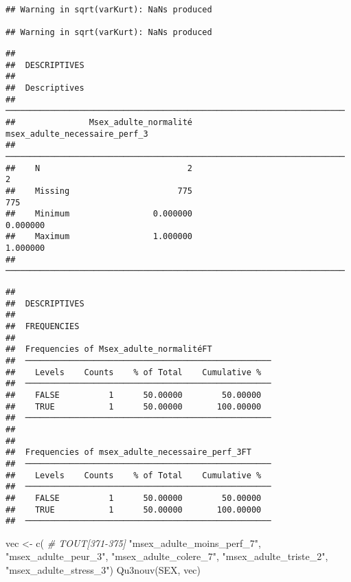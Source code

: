 \documentclass[
]{article}
\newenvironment{Shaded}{\begin{snugshade}}{\end{snugshade}}
\newcommand{\CommentTok}[1]{\textcolor[rgb]{0.56,0.35,0.01}{\textit{#1}}}
\newcommand{\FunctionTok}[1]{\textcolor[rgb]{0.00,0.00,0.00}{#1}}
\newcommand{\NormalTok}[1]{#1}
\newcommand{\OtherTok}[1]{\textcolor[rgb]{0.56,0.35,0.01}{#1}}
\newcommand{\StringTok}[1]{\textcolor[rgb]{0.31,0.60,0.02}{#1}}
\begin{document}
\begin{verbatim}
## Warning in sqrt(varKurt): NaNs produced

## Warning in sqrt(varKurt): NaNs produced
\end{verbatim}

\begin{verbatim}
## 
##  DESCRIPTIVES
## 
##  Descriptives                                                          
##  ───────────────────────────────────────────────────────────────────── 
##               Msex_adulte_normalité    msex_adulte_necessaire_perf_3   
##  ───────────────────────────────────────────────────────────────────── 
##    N                              2                                2   
##    Missing                      775                              775   
##    Minimum                 0.000000                         0.000000   
##    Maximum                 1.000000                         1.000000   
##  ─────────────────────────────────────────────────────────────────────
\end{verbatim}

\begin{verbatim}
## 
##  DESCRIPTIVES
## 
##  FREQUENCIES
## 
##  Frequencies of Msex_adulte_normalitéFT             
##  ────────────────────────────────────────────────── 
##    Levels    Counts    % of Total    Cumulative %   
##  ────────────────────────────────────────────────── 
##    FALSE          1      50.00000        50.00000   
##    TRUE           1      50.00000       100.00000   
##  ────────────────────────────────────────────────── 
## 
## 
##  Frequencies of msex_adulte_necessaire_perf_3FT     
##  ────────────────────────────────────────────────── 
##    Levels    Counts    % of Total    Cumulative %   
##  ────────────────────────────────────────────────── 
##    FALSE          1      50.00000        50.00000   
##    TRUE           1      50.00000       100.00000   
##  ──────────────────────────────────────────────────
\end{verbatim}

\begin{Shaded}
\begin{Highlighting}[]
\NormalTok{vec }\OtherTok{\textless{}{-}} \FunctionTok{c}\NormalTok{(  }\CommentTok{\# TOUT[371{-}375]}
  \StringTok{"msex\_adulte\_moins\_perf\_7"}\NormalTok{, }\StringTok{"msex\_adulte\_peur\_3"}\NormalTok{,                                  }
  \StringTok{"msex\_adulte\_colere\_7"}\NormalTok{, }\StringTok{"msex\_adulte\_triste\_2"}\NormalTok{,                                }
  \StringTok{"msex\_adulte\_stress\_3"}\NormalTok{)      }
\FunctionTok{Qu3nouv}\NormalTok{(SEX, vec)}
\end{Highlighting}
\end{Shaded}
\end{document}
